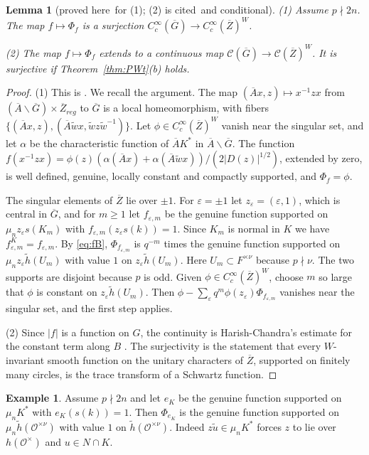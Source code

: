 \documentclass[12pt,letterpaper]{article}
\numberwithin{equation}{section}
\newtheorem{lemma}[theorem]{Lemma}
\theoremstyle{definition}
\newtheorem{xexample}[theorem]{Example}
\newcommand{\proved}{proved here}
\newcommand{\cited}{cited}
\newcommand{\cond}{conditional}
\newcommand{\OF}{\mathcal O}
\newcommand{\bG}{\overline{G}}
\newcommand{\bA}{\overline{A}}
\newcommand{\bZ}{\overline{Z}}
\newcommand{\wt}{\tilde w}
\newcommand{\hl}{\tilde h}
\newcommand{\calC}{\mathcal C}
\begin{document}
\begin{lemma}[\proved\ for (1); (2) is \cited\ and \cond]\label{lem:orbital-image}
(1) Assume $p\nmid2n$.  The map $f\mapsto\Phi_f$ is a surjection
$C_c^\infty(\bG)\to C_c^\infty(\bZ)^W$.

(2) The map $f\mapsto\Phi_f$ extends to a continuous map
$\calC(\bG)\to\calC(\bZ)^W$.  It is surjective if Theorem~\ref{thm:PWt}(b) holds.
\end{lemma}
\begin{proof}
(1) This is \cite[Theorem on the image of the split orbital integral]{JoUD}.  We recall
the argument.  The map $(\bA x,z)\mapsto x^{-1}zx$ from
$(\bA\backslash\bG)\times\bZ_{reg}$ to $\bG$ is a local homeomorphism, with fibers
$\{(\bA x,z),(\bA\wt x,\wt z\wt^{-1})\}$.  Let $\phi\in C_c^\infty(\bZ)^W$ vanish near the
singular set, and let $\alpha$ be the characteristic function of $\bA K^*$ in
$\bA\backslash\bG$.  The function
$f(x^{-1}zx)=\phi(z)(\alpha(\bA x)+\alpha(\bA\wt x))/(2|D(z)|^{1/2})$, extended by zero, is
well defined, genuine, locally constant and compactly supported, and $\Phi_f=\phi$.

The singular elements of $\bZ$ lie over $\pm1$.  For $\varepsilon=\pm1$ let
$z_\varepsilon=(\varepsilon,1)$, which is central in $\bG$, and for $m\ge1$ let
$f_{\varepsilon,m}$ be the genuine function supported on $\mu_nz_\varepsilon s(K_m)$ with
$f_{\varepsilon,m}(z_\varepsilon s(k))=1$.  Since $K_m$ is normal in $K$ we have
$f_{\varepsilon,m}^K=f_{\varepsilon,m}$.  By \eqref{eq:fB},
$\Phi_{f_{\varepsilon,m}}$ is $q^{-m}$ times the genuine function supported on
$\mu_nz_\varepsilon\hl(U_m)$ with value $1$ on $z_\varepsilon\hl(U_m)$.  Here
$U_m\subset F^{\times\nu}$ because $p\nmid\nu$.  The two supports are disjoint because $p$ is
odd.  Given $\phi\in C_c^\infty(\bZ)^W$, choose $m$ so large that $\phi$ is constant on
$z_\varepsilon\hl(U_m)$.  Then
$\phi-\sum_\varepsilon q^m\phi(z_\varepsilon)\Phi_{f_{\varepsilon,m}}$ vanishes near the
singular set, and the first step applies.

(2) Since $|f|$ is a function on $G$, the continuity is Harish-Chandra's estimate for the
constant term along $B$ \cite[\S4.4]{Si79}.  The surjectivity is the statement that every
$W$-invariant smooth function on the unitary characters of $\bZ$, supported on finitely
many circles, is the trace transform of a Schwartz function.
\end{proof}

\begin{xexample}\label{ex:Phi-eK}
Assume $p\nmid 2n$ and let $e_K$ be the genuine function supported on $\mu_nK^*$ with
$e_K(s(k))=1$.  Then $\Phi_{e_K}$ is the genuine function supported on
$\mu_n\hl(\OF^{\times\nu})$ with value $1$ on $\hl(\OF^{\times\nu})$.  Indeed $z\tilde u\in\mu_nK^*$
forces $z$ to lie over $h(\OF^\times)$ and $u\in N\cap K$.
\end{xexample}
\end{document}
